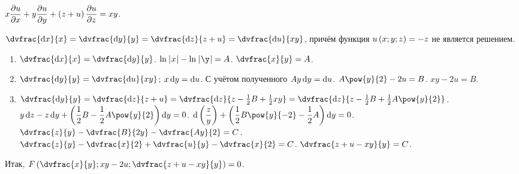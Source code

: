 \documentclass[a5paper,10pt]{article}
\begin{document}
    $x \dfrac{\partial u}{\partial x} + y \dfrac{\partial u}{\partial y} + \left(\hspace{0.01em}z + u\hspace{0.01em}\right) \dfrac{\partial u}{\partial z} = xy$.
    
    $\dvfrac {\di x} {x} 
    = \dvfrac {\di y} {y} 
    = \dvfrac {\di z} {z + u} 
    = \dvfrac {\di u} {xy}$,
    причём функция $u\left(\hspace{0.01em}x; y; z\hspace{0.01em}\right) = -z$ не  является решением.
    
    \begin{enumerate}
        \item $\dvfrac {\di x} {x} = \dvfrac {\di y} {y}$.
        $\ln\vbr{x} - \ln\vbr{\y} = A$.
        $\dvfrac{x}{y} = A$.
        
        \item $\dvfrac{\di y}{y} = \dvfrac{\di u}{xy}$;
        $x \di y = \di u$. С учётом полученного $A y \di y = \di u$.
        $A \pow{y}{2} - 2u = B$.
        $xy - 2u = B$.

        \item $\dvfrac{\di y}{y} = \dvfrac{\di z}{z + u} 
        = \dvfrac{\di z}{z - \frac{1}{2}B + \frac{1}{2} xy}
        = \dvfrac{\di z}{z - \frac{1}{2}B + \frac{1}{2} A\pow{y}{2}}$. \\
        $y \di z - z \di y + \br{\dfrac {1}{2} B - \dfrac{1}{2} A\pow{y}{2}} \di y = 0$.
        $\di \br{\dfrac{z}{y}} + \br{\dfrac {1}{2} B \pow{y}{-2} - \dfrac{1}{2} A} \di y = 0$.
        $\dvfrac{z}{y} - \dvfrac{B}{2y} - \dvfrac {Ay}{2} = C$.
        $\dvfrac{z}{y} - \dvfrac{x}{2} + \dvfrac{u}{y} - \dvfrac{x}{2} = C$.
        $\dvfrac{z + u - xy}{y} = C$.
    \end{enumerate}

    Итак, 
    $F\br{\dvfrac{x}{y}; xy - 2u; \dvfrac{z + u - xy}{y}} = 0$.
\end{document}
